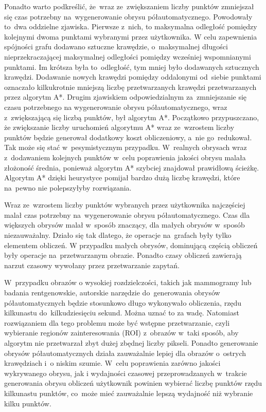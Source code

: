 \documentclass[a4paper,11pt,twoside,openright]{report}
\theoremstyle{definition}
\begin{document}
Ponadto warto podkreślić, że~wraz 
ze~zwiększaniem liczby punktów zmniejszał się czas potrzebny na~wygenerowanie
obrysu półautomatycznego. Powodowały to~dwa oddzielne zjawiska. Pierwsze z~nich, to
maksymalna odległość pomiędzy kolejnymi dwoma punktami wybranymi przez użytkownika.
W celu zapewnienia spójności grafu dodawano sztuczne krawędzie, o~maksymalnej długości
nieprzekraczającej maksymalnej odległości pomiędzy wcześniej wspomnianymi punktami.
Im krótsza była to~odległość, tym mniej było dodawanych sztucznych krawędzi.
Dodawanie nowych krawędzi pomiędzy oddalonymi od~siebie punktami oznaczało
kilkukrotnie mniejszą liczbę przetwarzanych krawędzi przetwarzanych przez algorytm
A*. Drugim zjawiskiem odpowiedzialnym za~zmniejszanie się czasu potrzebnego na
wygenerowanie obrysu półautomatycznego, wraz z~zwiększającą się liczbą punktów,
był algorytm A*. Początkowo przypuszczano, że zwiększanie liczby uruchomień algorytmu
A* wraz ze~wzrostem liczby punktów będzie generował dodatkowy koszt obliczeniowy,
a~nie go~redukował. Tak może się stać w~pesymistycznym przypadku. W~realnych
obrysach wraz z~dodawaniem kolejnych punktów w~celu poprawienia jakości obrysu
malała złożoność średnia, ponieważ algorytm A* szybciej znajdował prawidłową
ścieżkę. Algorytm A* dzięki heurystyce pomijał bardzo dużą liczbę krawędzi,
które na~pewno nie polepszyłyby rozwiązania.

Wraz ze~wzrostem liczby punktów wybranych przez użytkownika najczęściej malał
czas potrzebny na~wygenerowanie obrysu półautomatycznego. Czas dla większych
obrysów malał w~sposób znaczący, dla małych obrysów w~sposób niezauważalny.
Działo się tak dlatego, że operacje na~grafach były tylko elementem obliczeń. W
przypadku małych obrysów, dominującą częścią obliczeń były operacje na~przetwarzanym
obrazie. Ponadto czasy obliczeń zawierają narzut czasowy wywołany przez
przetwarzanie zapytań.

W~przypadku obrazów o wysokiej rozdzielczości, takich jak mammogramy lub badania 
rentgenowskie, autorskie narzędzie do~generowania obrysów półautomatycznych
będzie stosunkowo długo wykonywało obliczenia, rzędu kilkunastu do~kilkudziesięciu
sekund. Można uznać to za wadę. Natomiast rozwiązaniem dla tego problemu może być 
wstępne przetwarzanie, czyli wybieranie regionów zainteresowania (ROI)
z~obrazów
w~taki sposób, aby algorytm nie przetwarzał zbyt dużej zbędnej liczby pikseli.
Ponadto generowanie obrysów
półautomatycznych działa zauważalnie lepiej dla obrazów o~ostrych krawędziach i~o
niskim szumie. W~celu poprawienia zarówno jakości wykrywanego obrysu, jak i
wydajności czasowej przeprowadzanych w~trakcie generowania obrysu obliczeń użytkownik
powinien wybierać liczbę punktów rzędu kilkunastu punktów, co~może mieć zauważalnie
lepszą wydajność niż wybranie kilku punktów.
\end{document}
